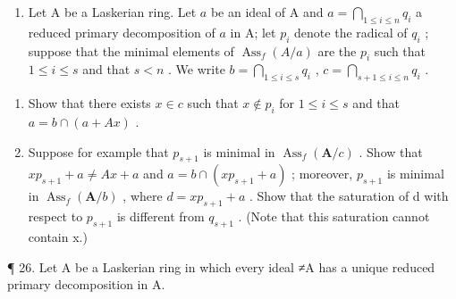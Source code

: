 \begin{enumerate}
\def\labelenumi{\arabic{enumi}.}
\setcounter{enumi}{24}
\tightlist
\item
  Let A be a Laskerian ring. Let \(a\) be an ideal of A and \(a = \bigcap_{1 \leqslant i \leqslant n} q_i\) a reduced primary decomposition of \(a\) in A; let \(p_i\) denote the radical of \(q_i\) ; suppose that the minimal elements of \(\operatorname{Ass}_f(A/a)\) are the \(p_i\) such that \(1 \leqslant i \leqslant s\) and that \(s < n\) . We write \(b = \bigcap_{1 \leqslant i \leqslant s} q_i\) , \(c = \bigcap_{s+1 \leqslant i \leqslant n} q_i\) .
\end{enumerate}

\begin{enumerate}
\def\labelenumi{(\alph{enumi})}
\item
  Show that there exists \(x \in c\) such that \(x \notin p_i\) for \(1 \leqslant i \leqslant s\) and that \(a = b \cap (a + Ax)\) .
\item
  Suppose for example that \(p_{s+1}\) is minimal in \(\operatorname{Ass}_{f}(\mathbf{A}/c)\) . Show that \(xp_{s+1} + a \neq Ax + a\) and \(a = b \cap (xp_{s+1} + a)\) ; moreover, \(p_{s+1}\) is minimal in \(\operatorname{Ass}_{f}(\mathbf{A}/b)\) , where \(d = xp_{s+1} + a\) . Show that the saturation of d with respect to \(p_{s+1}\) is different from \(q_{s+1}\) . (Note that this saturation cannot contain x.)
\end{enumerate}

¶ 26. Let A be a Laskerian ring in which every ideal ≠A has a unique reduced primary decomposition in A.

